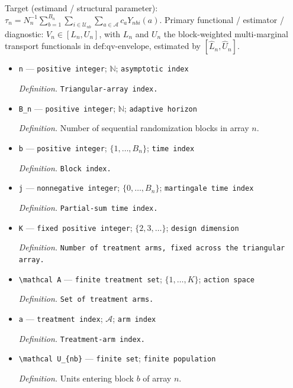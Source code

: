 \documentclass{article}
\begin{document}
Target (estimand / structural parameter): \(\tau_n=N_n^{-1}\sum_{b=1}^{B_n}\sum_{i\in\mathcal U_{nb}}\sum_{a\in\mathcal A}c_aY_{nbi}(a)\).
Primary functional / estimator / diagnostic: \(V_n\in[L_n,U_n]\), with \(L_n\) and \(U_n\) the block-weighted multi-marginal transport functionals in \(\text{def:qv-envelope}\), estimated by \([\widehat L_n,\widehat U_n]\).
\begin{itemize}
  \item \texttt{n} --- \texttt{positive integer}; \(\mathbb N\); \texttt{asymptotic index}
  \par\smallskip\noindent\emph{Definition.} \texttt{Triangular-\allowbreak{}array index.}
  \item \texttt{B\_\allowbreak{}n} --- \texttt{positive integer}; \(\mathbb N\); \texttt{adaptive horizon}
  \par\smallskip\noindent\emph{Definition.} Number of sequential randomization blocks in array \(n\).
  \item \texttt{b} --- \texttt{positive integer}; \(\{1,\ldots,B_n\}\); \texttt{time index}
  \par\smallskip\noindent\emph{Definition.} \texttt{Block index.}
  \item \texttt{j} --- \texttt{nonnegative integer}; \(\{0,\ldots,B_n\}\); \texttt{martingale time index}
  \par\smallskip\noindent\emph{Definition.} \texttt{Partial-\allowbreak{}sum time index.}
  \item \texttt{K} --- \texttt{fixed positive integer}; \(\{2,3,\ldots\}\); \texttt{design dimension}
  \par\smallskip\noindent\emph{Definition.} \texttt{Number of treatment arms,\allowbreak{} fixed across the triangular array.}
  \item \texttt{\textbackslash{}\allowbreak{}mathcal A} --- \texttt{finite treatment set}; \(\{1,\ldots,K\}\); \texttt{action space}
  \par\smallskip\noindent\emph{Definition.} \texttt{Set of treatment arms.}
  \item \texttt{a} --- \texttt{treatment index}; \(\mathcal A\); \texttt{arm index}
  \par\smallskip\noindent\emph{Definition.} \texttt{Treatment-\allowbreak{}arm index.}
  \item \texttt{\textbackslash{}\allowbreak{}mathcal U\_\allowbreak{}\{nb\}\allowbreak{}} --- \texttt{finite set}; \texttt{finite population}
  \par\smallskip\noindent\emph{Definition.} Units entering block \(b\) of array \(n\).

\end{itemize}
\end{document}
